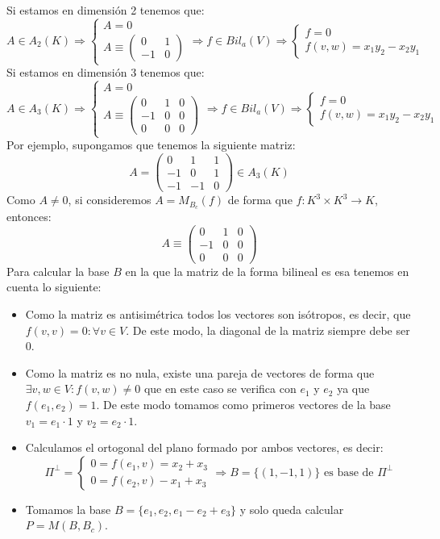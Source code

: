 \documentclass[10pt,a4paper,openright]{book}
\begin{document}
Si estamos en dimensión 2 tenemos que:
$$A\in A_2(K)\Rightarrow\begin{cases} A = 0 \\ A\equiv \begin{pmatrix} 0 & 1\\ -1 & 0\end{pmatrix}\end{cases}\Rightarrow f\in Bil_a(V)\Rightarrow \begin{cases} f = 0 \\ f(v,w) = x_1y_2-x_2y_1 \end{cases}$$
Si estamos en dimensión 3 tenemos que:
$$A\in A_3(K)\Rightarrow\begin{cases} A = 0 \\ A\equiv \begin{pmatrix} 0 & 1 & 0\\ -1 & 0 & 0 \\ 0 & 0 & 0 \end{pmatrix}\end{cases}\Rightarrow f\in Bil_a(V)\Rightarrow \begin{cases} f = 0 \\ f(v,w) = x_1y_2-x_2y_1 \end{cases}$$
Por ejemplo, supongamos que tenemos la siguiente matriz:
$$A= \begin{pmatrix} 0 & 1 & 1 \\ -1 & 0 & 1 \\ -1 & -1 & 0\end{pmatrix}\in A_3(K)$$
Como $A\neq 0$, si consideremos $A=M_{B_c}(f)$ de forma que $f: K^3\times K^3\rightarrow K$, entonces:
$$A \equiv \begin{pmatrix} 0 & 1 & 0 \\ -1 & 0 & 0 \\ 0 & 0 & 0\end{pmatrix}$$
Para calcular la base $B$ en la que la matriz de la forma bilineal es esa tenemos en cuenta lo siguiente:
\begin{itemize}
\item  Como la matriz es antisimétrica todos los vectores son isótropos, es decir, que $f(v,v)=0: \forall v\in V$. De este modo, la diagonal de la matriz siempre debe ser 0.
\item Como la matriz es no nula, existe una pareja de vectores de forma que $\exists v,w\in V: f(v,w)\neq 0$ que en este caso se verifica con $e_1$ y $e_2$ ya que $f(e_1,e_2)=1$. De este modo tomamos como primeros vectores de la base $v_1= e_1\cdot 1$ y $v_2 = e_2\cdot 1$.
\item  Calculamos el ortogonal del plano formado por ambos vectores, es decir:
$$\Pi^\perp = \begin{cases} 0 = f(e_1,v) = x_2+ x_3 \\ 0= f(e_2,v)-x_1+x_3\end{cases}\Rightarrow B = \{(1,-1,1)\}\mbox{ es base de }\Pi^\perp$$
\item Tomamos la base $B=\{e_1,e_2, e_1-e_2+e_3\}$ y solo queda calcular $P=M(B,B_c)$.
\end{itemize}
\end{document}
